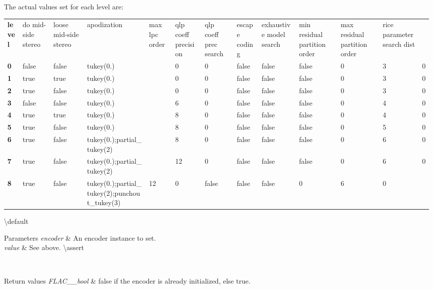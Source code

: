 The actual values set for each level are\+: \tabulinesep=1mm
\begin{longtabu}spread 0pt [c]{*{13}{|X[-1]}|}
\hline
{\bfseries{level}} &do mid-\/side stereo &loose mid-\/side stereo &apodization &max lpc order &qlp coeff precision &qlp coeff prec search &escape coding &exhaustive model search &min residual partition order &max residual partition order &rice parameter search dist  \\
{\bfseries{0}} &false &false &tukey(0.)&&0 &0 &false &false &false &0 &3 &0  \\
{\bfseries{1}} &true &true &tukey(0.)&&0 &0 &false &false &false &0 &3 &0  \\
{\bfseries{2}} &true &false &tukey(0.)&&0 &0 &false &false &false &0 &3 &0  \\
{\bfseries{3}} &false &false &tukey(0.)&&6 &0 &false &false &false &0 &4 &0  \\
{\bfseries{4}} &true &true &tukey(0.)&&8 &0 &false &false &false &0 &4 &0  \\
{\bfseries{5}} &true &false &tukey(0.)&&8 &0 &false &false &false &0 &5 &0  \\
{\bfseries{6}} &true &false &tukey(0.);partial\+\_\+tukey(2)&&8 &0 &false &false &false &0 &6 &0  \\
{\bfseries{7}} &true &false &tukey(0.);partial\+\_\+tukey(2)&&12 &0 &false &false &false &0 &6 &0  \\
{\bfseries{8}} &true &false &tukey(0.);partial\+\_\+tukey(2);punchout\+\_\+tukey(3) &12 &0 &false &false &false &0 &6 &0  \\
\end{longtabu}


\textbackslash{}default {} 
\begin{DoxyParams}{Parameters}
{\em encoder} & An encoder instance to set. \\
\hline
{\em value} & See above. \textbackslash{}assert 
\begin{DoxyCode}{1}
\end{DoxyCode}
 \\
\hline
\end{DoxyParams}

\begin{DoxyRetVals}{Return values}
{\em F\+L\+A\+C\+\_\+\+\_\+bool} & {\ttfamily false} if the encoder is already initialized, else {\ttfamily true}. \\
\hline
\end{DoxyRetVals}
\mbox{\label{group__flac__stream__encoder_gaa839d19b6d1b30ba0407d419bdb6fe67}} 
